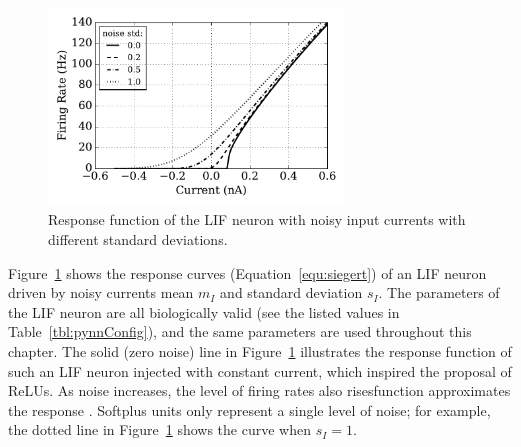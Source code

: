 	
	\begin{figure}[bt]
		\centering
		\includegraphics[width=0.7\textwidth]{pics_iconip/1.pdf}
		\DIFdelbeginFL %
\DIFdelendFL \DIFaddbeginFL \caption[Response function of the LIF neuron.]{\DIFaddendFL Response function of the LIF neuron with noisy input currents with different standard deviations.}
		\label{Fig:physics}
	\end{figure}

	Figure~\ref{Fig:physics} shows the response curves (Equation~\ref{equ:siegert}) of an LIF neuron driven by noisy currents \DIFdelbegin {}\DIFdelend \DIFaddbegin {}\DIFaddend mean $m_I$ and standard deviation $s_I$.
	The parameters of the LIF neuron are all biologically valid (see the listed values in Table~\ref{tbl:pynnConfig}), and the same parameters are used throughout this chapter.
	The solid (zero noise) line in Figure~\ref{Fig:physics} illustrates the response function of such an LIF neuron injected with constant current, which inspired the proposal of ReLUs.
	As noise increases, the level of firing rates also rises\DIFdelbegin {}\DIFdelend \DIFaddbegin {}\DIFaddend function approximates the response \DIFdelbegin {}\DIFdelend \DIFaddbegin {}\DIFaddend .
	Softplus units only represent a single level of noise; for example, the dotted line in Figure~\ref{Fig:physics} shows the curve when $s_I=1$.

